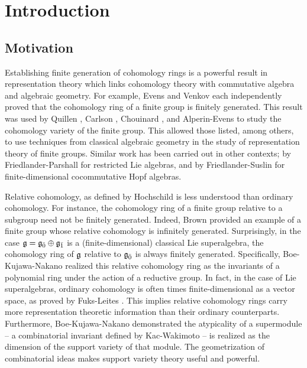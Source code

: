 \chapter{Introduction}
\label{chap:intro}

\section{Motivation}

Establishing finite generation of cohomology rings is a powerful result in representation theory which links cohomology theory with commutative algebra and algebraic geometry. For example, Evens \cite{Evens-cohomology-ring} and Venkov \cite{MR0108788} each independently proved that the cohomology ring of a finite group is finitely generated. This result was used by Quillen \cite{MR0298694}, Carlson \cite{MR723070}, Chouinard \cite{MR0401943}, and Alperin-Evens \cite{MR621284} to study the cohomology variety of the finite group. This allowed those listed, among others, to use techniques from classical algebraic geometry in the study of representation theory of finite groups. Similar work has been carried out in other contexts; by Friedlander-Parshall \cite{FP-unipotent,MR860682} for restricted Lie algebras, and by Friedlander-Suslin \cite{MR1427618} for finite-dimensional cocommutative Hopf algebras.

Relative cohomology, as defined by Hochschild \cite{hochschild} is less understood than ordinary cohomology. For instance, the cohomology ring of a finite group relative to a subgroup need not be finitely generated. Indeed, Brown \cite{MR1310744} provided an example of a finite group whose relative cohomology is infinitely generated. Surprisingly, in the case $\mathfrak{g} = {\mathfrak{g}}_{\bar{0}} \oplus {\mathfrak{g}}_{\bar{1}}$ is a (finite-dimensional) classical Lie superalgebra, the cohomology ring of $\mathfrak{g}$ relative to ${\mathfrak{g}}_{\bar{0}}$ is always finitely generated. Specifically, Boe-Kujawa-Nakano \cite{BKN-1} realized this relative cohomology ring as the invariants of a polynomial ring under the action of a reductive group. In fact, in the case of Lie superalgebras, ordinary cohomology is often times finite-dimensional as a vector space, as proved by Fuks-Leites \cite{fuks}
. This implies relative cohomology rings carry more representation theoretic information than their ordinary counterparts. Furthermore, Boe-Kujawa-Nakano \cite{BKN-1} demonstrated the atypicality of a supermodule -- a combinatorial invariant defined by Kac-Wakimoto \cite{MR1327543} -- is realized as the dimension of the support variety of that module. The geometrization of combinatorial ideas makes support variety theory useful and powerful.

